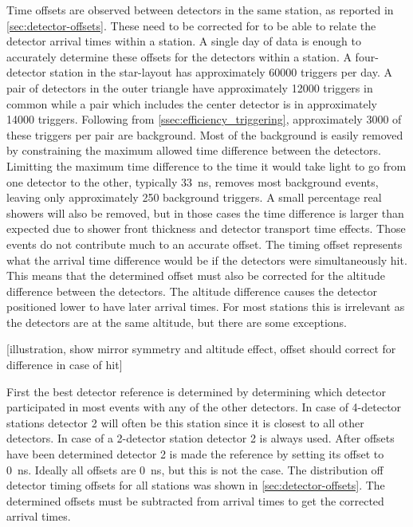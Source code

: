 Time offsets are observed between detectors in the same station, as reported in \cref{sec:detector-offsets}. These need to be corrected for to be able to relate the detector arrival times within a station. A single day of data is enough to accurately determine these offsets for the detectors within a station. A four-detector station in the star-layout has approximately \num{60000} triggers per day. A pair of detectors in the outer triangle have approximately \num{12000} triggers in common while a pair which includes the center detector is in approximately \num{14000} triggers. Following from \cref{ssec:efficiency_triggering}, approximately \num{3000} of these triggers per pair are background. Most of the background is easily removed by constraining the maximum allowed time difference between the detectors. Limitting the maximum time difference to the time it would take light to go from one detector to the other, typically \SI{33}{\ns}, removes most background events, leaving only approximately \num{250} background triggers. A small percentage real showers will also be removed, but in those cases the time difference is larger than expected due to shower front thickness and detector transport time effects. Those events do not contribute much to an accurate offset. The timing offset represents what the arrival time difference would be if the detectors were simultaneously hit. This means that the determined offset must also be corrected for the altitude difference between the detectors. The altitude difference causes the detector positioned lower to have later arrival times. For most stations this is irrelevant as the detectors are at the same altitude, but there are some exceptions.

[illustration, show mirror symmetry and altitude effect, offset should correct for difference in case of hit]

First the best detector reference is determined by determining which detector participated in most events with any of the other detectors. In case of 4-detector stations detector 2 will often be this station since it is closest to all other detectors. In case of a 2-detector station detector 2 is always used. After offsets have been determined detector 2 is made the reference by setting its offset to \SI{0}{\ns}. Ideally all offsets are \SI{0}{\ns}, but this is not the case. The distribution off detector timing offsets for all \hisparc stations was shown in \cref{sec:detector-offsets}. The determined offsets must be subtracted from arrival times to get the corrected arrival times.


